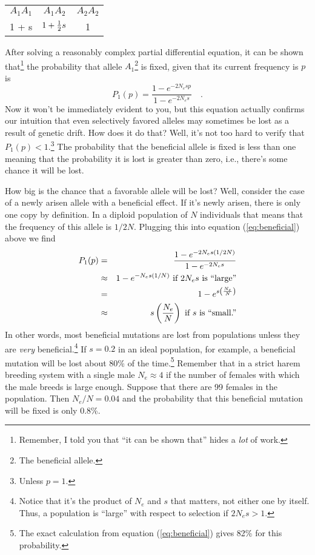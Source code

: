 \begin{center}
\begin{tabular}{ccc}
$A_1A_1$ & $A_1A_2$      & $A_2A_2$ \\
1 + s    & $1 + \frac{1}{2} s$ & 1
\end{tabular}
\end{center}

After solving a reasonably complex partial differential equation, it
can be shown that\footnote{Remember, I told you that ``it can be shown
that'' hides a {\it lot\/} of work.} the probability that allele
$A_1$\footnote{The beneficial allele.}  is fixed, given that its
current frequency is $p$ is
\begin{equation}
P_1(p) = \frac{1 - e^{-2N_esp}}{1 - e^{-2N_es}} \quad .
\label{eq:beneficial}
\end{equation}
Now it won't be immediately evident to you, but this equation actually
confirms our intuition that even selectively favored alleles may
sometimes be lost as a result of genetic drift. How does it do that?
Well, it's not too hard to verify that $P_1(p) < 1$.\footnote{Unless
  $p=1$.} The probability that the beneficial allele is fixed is less
than one meaning that the probability it is lost is greater than zero,
i.e., there's some chance it will be lost.

How big is the chance that a favorable allele will be
lost? Well, consider the
case of a newly arisen allele with a beneficial effect. If it's newly
arisen, there is only one copy by definition. In a diploid population
of $N$ individuals that means that the frequency of this allele is
$1/2N$. Plugging this into equation (\ref{eq:beneficial}) above we
find
\begin{eqnarray*}
P_1(p) &=& \frac{1 - e^{-2N_es(1/2N)}}{1 - e^{-2N_es}} \\
       &\approx& 1 - e^{-N_es(1/N)} \hbox{ if $2N_es$ is ``large''} \\
       &=& 1 - e^{s\left(\frac{N_e}{N}\right)} \\
       &\approx& s\left(\frac{N_e}{N}\right)
                 \hbox{ if $s$ is ``small.''}
\end{eqnarray*}
In other words, most beneficial mutations are lost from populations
unless they are {\it very\/} beneficial.\footnote{Notice that it's the
  product of $N_e$ and $s$ that matters, not either one by
  itself. Thus, a population is ``large'' with respect to selection if
  $2N_es > 1$.} If $s=0.2$ in an ideal population, for example, a
beneficial mutation will be lost about 80\% of the time.\footnote{The
  exact calculation from equation (\ref{eq:beneficial}) gives 82\% for
  this probability.} Remember that in a strict harem breeding system
with a single male $N_e \approx 4$ if the number of females with which
the male breeds is large enough. Suppose that there are 99 females in
the population. Then $N_e/N = 0.04$ and the probability that this
beneficial mutation will be fixed is only 0.8\%.

